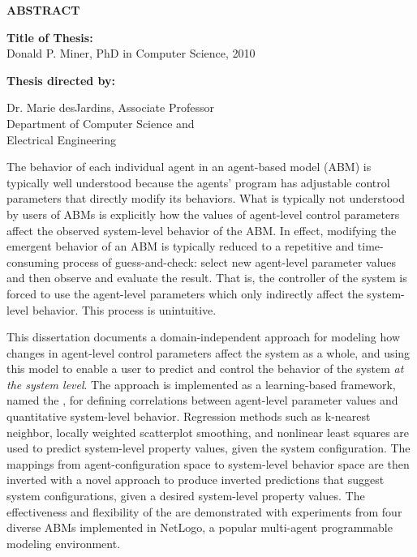 \newpage
\pagestyle{empty}

\begin{center}
\vspace{0.1in}
\large{\bf ABSTRACT} \par  
\bigskip \bigskip
\end{center}

\begin{flushleft}
{\bf Title of Thesis:} \thesistitle\\
Donald P. Miner, PhD in Computer Science, 2010 \\
\begin{singlespace}
{\bf Thesis directed by:}{\hspace{2.5mm}} \parbox[t]{3in}{Dr. Marie desJardins, Associate Professor\\
Department of Computer Science and \\ Electrical Engineering}
\end{singlespace}
\end{flushleft}


The behavior of each individual agent in an agent-based model (ABM) is typically well understood because the agents' program has adjustable control parameters that directly modify its behaviors.
What is typically not understood by users of ABMs is explicitly how the values of agent-level control parameters affect the observed
system-level behavior of the ABM.
In effect, modifying the emergent behavior of an ABM is typically reduced to a repetitive and time-consuming process of guess-and-check: select new agent-level parameter values and then observe and evaluate the result.
That is, the controller of the system is forced to use the agent-level parameters which only indirectly affect the system-level behavior.
This process is unintuitive.

This dissertation documents a domain-independent approach for modeling how changes in agent-level control parameters affect the system as a whole, and using this model to enable a user to predict and control the behavior of the system \textit{at the system level}.
The approach is implemented as a learning-based framework, named the \framework,  for defining correlations between agent-level parameter values and quantitative system-level behavior.
Regression methods such as k-nearest neighbor, locally weighted scatterplot smoothing, and nonlinear least squares are used to predict system-level property values, given the system configuration.
The mappings from agent-configuration space to system-level behavior space are then inverted with a novel approach to produce inverted predictions that suggest system configurations, given a desired system-level property values.
The effectiveness and flexibility of the \framework are demonstrated with experiments from four diverse ABMs implemented in NetLogo, a popular multi-agent programmable modeling environment.


\par\vfil

